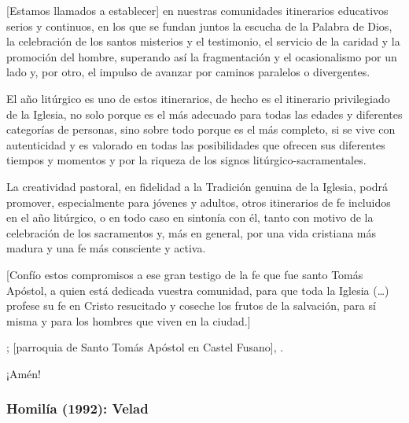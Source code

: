 \begin{body}
	{[}Estamos llamados a establecer{]} en nuestras comunidades itinerarios educativos serios y continuos, en los que se fundan juntos la escucha de la Palabra de Dios, la celebración de los santos misterios y el testimonio, el servicio de la caridad y la promoción del hombre, superando así la fragmentación y el ocasionalismo por un lado y, por otro, el impulso de avanzar por caminos paralelos o divergentes. 
	
	El año litúrgico es uno de estos itinerarios, de hecho es el itinerario privilegiado de la Iglesia, no solo porque es el más adecuado para todas las edades y diferentes categorías de personas, sino sobre todo porque es el más completo, si se vive con autenticidad y es valorado en todas las posibilidades que ofrecen sus diferentes tiempos y momentos y por la riqueza de los signos litúrgico-sacramentales. 
	
	La creatividad pastoral, en fidelidad a la Tradición genuina de la Iglesia, podrá promover, especialmente para jóvenes y adultos, otros itinerarios de fe incluidos en el año litúrgico, o en todo caso en sintonía con él, tanto con motivo de la celebración de los sacramentos y, más en general, por una vida cristiana más madura y una fe más consciente y activa. 
	
	{[}Confío estos compromisos a ese gran testigo de la fe que fue santo Tomás Apóstol, a quien está dedicada vuestra comunidad, para que toda la Iglesia (\ldots{}) profese su fe en Cristo resucitado y coseche los frutos de la salvación, para sí misma y para los hombres que viven en la ciudad.{]} 
	
	; {[}parroquia de Santo Tomás Apóstol en Castel Fusano{]}, . 
	
	¡Amén!
\end{body}

\newpage
\subsubsection{Homilía (1992): Velad}


